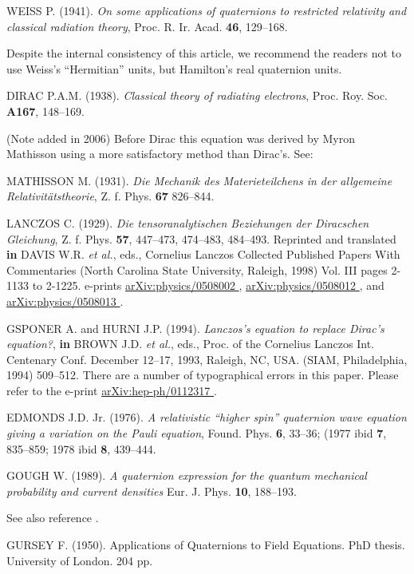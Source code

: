 \documentclass [12pt,a4paper      ]{article}
\begin{document}
\begin{enumerate}
  WEISS  P.  (1941).  \emph{On  some applications  of  quaternions  to restricted relativity and classical radiation  theory},  Proc.  R. 
Ir. Acad.   {\bf 46}, 129--168.

Despite  the internal consistency of this article,  we  recommend 
the  readers not to use Weiss's ``Hermitian'' units,  but Hamilton's 
real quaternion units.

 DIRAC P.A.M.  (1938). \emph{Classical theory of radiating electrons}, Proc. Roy. Soc.  {\bf A167}, 148--169.

(Note added in 2006) Before Dirac this equation was derived by Myron Mathisson using a more satisfactory method than Dirac's.  See:

MATHISSON M. (1931). \emph{Die Mechanik des Materieteilchens in der allgemeine Relativit\"atstheorie}, Z.  f. Phys. {\bf 67} 826--844.



  LANCZOS  C.  (1929). \emph{Die  tensoranalytischen  Beziehungen  der Diracschen Gleichung},  Z.  f. Phys.   {\bf 57}, 447--473, 474--483, 
484--493. Reprinted and translated {\bf in} DAVIS W.R. \emph{et al.}, eds., Cornelius Lanczos Collected Published Papers With Commentaries (North Ca\-rolina State University, Raleigh, 1998) Vol. III pages 2-1133 to 2-1225. e-prints \underline{ arXiv:physics/0508002 }, \underline{ arXiv:physics/0508012 }, and \underline{ arXiv:physics/0508013 }.

 GSPONER A. and HURNI J.P. (1994). \emph{Lanczos's equation to replace Dirac's equation?},  {\bf in} BROWN J.D. \emph{et al.}, eds., Proc. of the Cornelius Lanczos Int. Centenary Conf. December 12--17, 1993, Raleigh, NC, USA. (SIAM, Philadelphia, 1994) 509--512.  There are a number of typographical errors in this paper. Please refer to the e-print \underline{ arXiv:hep-ph/0112317 }.

  EDMONDS  J.D.   Jr.   (1976).  \emph{A  relativistic  ``higher  spin'' quaternion  wave  equation  giving  a  variation  on  the   Pauli 
equation},   Found.  Phys.   {\bf 6}, 33--36; (1977  ibid  {\bf 7}, 835--859; 
1978  ibid  {\bf 8}, 439--444.

GOUGH W.  (1989). \emph{A quaternion expression for the quantum mechanical 
probability and current densities} Eur. J. Phys.   {\bf 10}, 188--193.

See also reference \cite{R60}.

  GURSEY  F.  (1950). Applications  of  Quaternions  to  Field 
Equations.  PhD thesis. University of London. 204 pp.


\end{enumerate}
\end{document}

